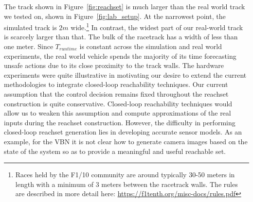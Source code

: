 \documentclass[manuscript,screen,review]{acmart}
\newcommand{\diego}[1]{\textcolor{purple}{\textbf{\underline{DM:}} #1}}
\newcommand{\figref}[1]{Figure~\ref{#1}}
\begin{document}
 The track shown in \figref{fig:reachset} is much larger than the real world track we tested on, shown in \figref{fig:lab_setup}. At the narrowest point, the simulated track is $2m$ wide.\footnote{Races held by the F1/10 community are around typically 30-50 meters in length with a minimum of 3 meters between the racetrack walls. The rules are described in more detail here: \url{https://f1tenth.org/misc-docs/rules.pdf}} In contrast, the widest part of our real-world track is scarcely larger than that. The bulk of the racetrack has a width of less than one meter. Since $T_{runtime}$ is constant across the simulation and real world experiments, the real world vehicle spends the majority of its time forecasting unsafe actions due to its close proximity to the track walls. The hardware experiments were quite illustrative in motivating our desire to extend the current methodologies to integrate closed-loop reachability techniques. Our current assumption that the control decision remains fixed throughout the reachset construction is quite conservative. Closed-loop reachability techniques would allow us to weaken this assumption and compute approximations of the real inputs during the reachset construction. However, the difficulty in performing closed-loop reachset generation lies in developing accurate sensor models. As an example, for the VBN it is not clear how to generate camera images based on the state of the system so as to provide a meaningful and useful reachable set.
\end{document}
